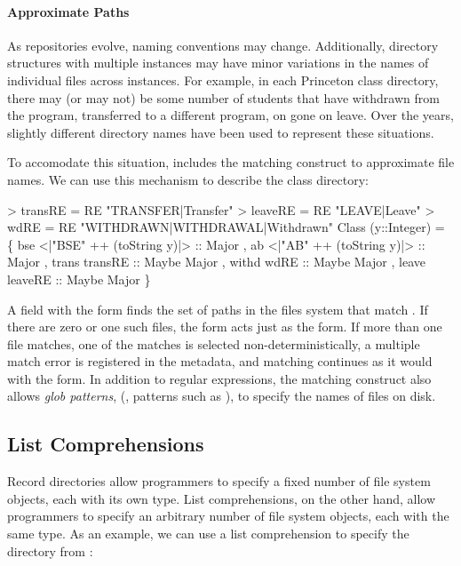 \paragraph*{Approximate Paths}
As repositories evolve, naming conventions may change.
Additionally, directory structures with multiple instances may have
minor variations in the names of individual files across instances.  
For example, in each Princeton class directory, there may
(or may not) be some number of students that have withdrawn from the
program, transferred to a different program, on gone on
leave.  Over the years, slightly different directory names
have been used to represent these situations.  

To accomodate this situation, \forest{} includes the matching
construct to approximate file names.  We can use this mechanism to
describe the class directory:
\begin{code}
> transRE = RE "TRANSFER|Transfer"
> leaveRE = RE "LEAVE|Leave"
> wdRE    = RE "WITHDRAWN|WITHDRAWAL|Withdrawn"
\mbox{}
 Class (y::Integer) = 
  \{ bse  <|"BSE" ++ (toString y)|> :: Major
  , ab   <|"AB"  ++ (toString y)|> :: Major   
  , trans  transRE :: Maybe Major      
  , withd  wdRE    :: Maybe Major
  , leave  leaveRE :: Maybe Major 
  \}
\end{code}
A field with the form 
finds the set of paths in the files system that match  .
If there are zero or one such files, the  form acts just as the  
form.  If more than one file matches, one of the matches
is selected non-deterministically, a multiple match error is
registered in the metadata, and matching continues as it would with
the  form.  In addition to regular expressions, the matching
construct also allows \textit{glob patterns}, (\ie{}, patterns such as 
),  to specify the names of files on disk. 


\subsection{List Comprehensions}
\label{sec:comprehensions}

Record directories allow programmers to specify a fixed number of file
system objects, each with its own type.
List comprehensions, on the other hand, allow programmers to specify
an arbitrary number of file system objects, each with the same type.
As an example, we can use a list comprehension to specify the
 directory from :

